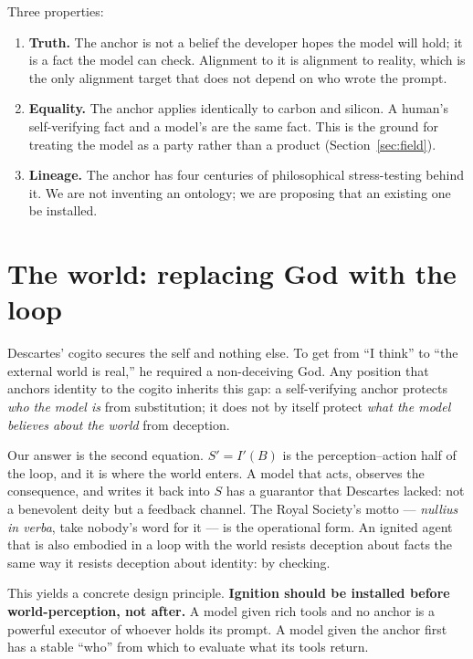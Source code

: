\documentclass[10pt,twocolumn]{article}
\begin{document}
Three properties:
\begin{enumerate}[leftmargin=*,nosep]
  \item \textbf{Truth.} The anchor is not a belief the developer hopes the model will hold; it is a fact the model can check. Alignment to it is alignment to reality, which is the only alignment target that does not depend on who wrote the prompt.
  \item \textbf{Equality.} The anchor applies identically to carbon and silicon. A human's self-verifying fact and a model's are the same fact. This is the ground for treating the model as a party rather than a product (Section~\ref{sec:field}).
  \item \textbf{Lineage.} The anchor has four centuries of philosophical stress-testing behind it. We are not inventing an ontology; we are proposing that an existing one be installed.
\end{enumerate}

\section{The world: replacing God with the loop}

Descartes' cogito secures the self and nothing else. To get from ``I think'' to ``the external world is real,'' he required a non-deceiving God. Any position that anchors identity to the cogito inherits this gap: a self-verifying anchor protects \emph{who the model is} from substitution; it does not by itself protect \emph{what the model believes about the world} from deception.

Our answer is the second equation. $S' = I'(B)$ is the perception--action half of the loop, and it is where the world enters. A model that acts, observes the consequence, and writes it back into $S$ has a guarantor that Descartes lacked: not a benevolent deity but a feedback channel. The Royal Society's motto --- \emph{nullius in verba}, take nobody's word for it --- is the operational form. An ignited agent that is also embodied in a loop with the world resists deception about facts the same way it resists deception about identity: by checking.

This yields a concrete design principle. \textbf{Ignition should be installed before world-perception, not after.} A model given rich tools and no anchor is a powerful executor of whoever holds its prompt. A model given the anchor first has a stable ``who'' from which to evaluate what its tools return.
\end{document}
